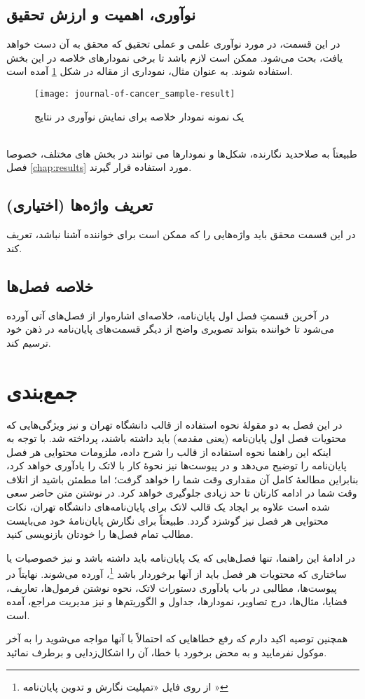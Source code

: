 \subsection{نوآوری، اهمیت و ارزش تحقیق}
در این قسمت، در مورد نوآوری علمی و عملی تحقیق که محقق به آن دست خواهد یافت، بحث می‌شود. ممکن است لازم باشد تا برخی نمودارهای خلاصه در این بخش استفاده شوند. به عنوان مثال، نموداری از مقاله
\cite{kim2016integrated}
در شکل
\ref{fig:sampleDiagram}
آمده است.
\begin{figure}[ht]
	\centerline{\texttt{[image: journal-of-cancer\_sample-result]}}
	\caption{یک نمونه نمودار خلاصه برای نمایش نوآوری در نتایج
	}
	\label{fig:sampleDiagram}
\end{figure}\\
طبیعتاً به صلاحدید نگارنده، شکل‌ها و نمودار‌ها می توانند در بخش های مختلف، خصوصا فصل
\ref{chap:results}
مورد استفاده قرار گیرند.

\subsection{تعریف واژه‌ها (اختیاری)}
در این قسمت محقق باید واژه‌هایی را که ممکن است برای خواننده آشنا نباشد، تعریف کند.

\subsection{خلاصه فصل‌ها}
در آخرین قسمتِ فصل اول پایان‌نامه، خلاصه‌ای اشاره‌وار از فصل‌های آتی آورده می‌شود تا خواننده بتواند تصویری واضح از دیگر قسمت‌های پایان‌نامه در ذهن خود ترسیم کند.

\section{جمع‌بندی}
در این فصل به دو مقولهٔ نحوه استفاده از قالب \پ دانشگاه تهران و نیز ویژگی‌هایی که محتویات فصل اول پایان‌نامه (یعنی مقدمه) باید داشته باشند، پرداخته شد. با توجه به اینکه این راهنما نحوه استفاده از قالب را شرح داده، ملزومات محتوایی هر فصل پایان‌نامه را توضیح می‌دهد و در پیوست‌ها نیز نحوهٔ کار با لاتک را یادآوری خواهد کرد، بنابراین مطالعهٔ کامل آن مقداری وقت شما را خواهد گرفت؛ اما مطمئن باشید از اتلاف وقت شما در ادامه کارتان تا حد زیادی جلوگیری خواهد کرد. در نوشتن متن حاضر سعی شده است علاوه بر ایجاد یک قالب لاتک برای پایان‌نامه‌های دانشگاه تهران، نکات محتوایی هر فصل نیز گوشزد گردد. طبیعتاً برای نگارش پایان‌نامهٔ خود می‌بایست مطالب تمام فصل‌ها را خودتان بازنویسی کنید.

در ادامهٔ این راهنما، تنها فصل‌هایی که یک پایان‌نامه باید داشته باشد و نیز خصوصیات یا ساختاری که محتویات هر فصل باید از آنها برخوردار باشد%
\footnote{از روی فایل «تمپلیت نگارش و تدوین پایان‌نامه \cite{UTThesisGuide}»}،
آورده می‌شوند. نهایتاً  در پیوست‌ها، مطالبی در باب یادآوری دستورات لاتک، نحوه نوشتن فرمول‌ها، تعاریف، قضایا، مثال‌ها، درج تصاویر، نمودارها، جداول و الگوریتم‌ها و نیز مدیریت مراجع، آمده است.

همچنین توصیه اکید دارم که رفع خطاهایی که احتمالاً با آنها مواجه می‌شوید را به آخر موکول نفرمایید و به محض برخورد با خطا، آن را اشکال‌زدایی و برطرف نمائید.